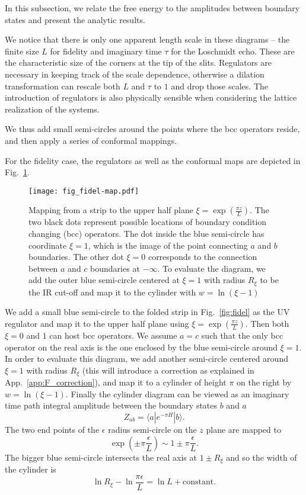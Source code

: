 
In this subsection, we relate the free energy to the amplitudes between boundary states and present the analytic results. 

We notice that there is only one apparent length scale in these diagrams -- the finite size $L$ for fidelity and imaginary time $\tau$ for the Loschmidt echo. These are the characteristic size of the corners at the tip of the slits. Regulators are necessary in keeping track of the scale dependence, otherwise a dilation transformation can rescale both $L$ and $\tau$ to $1$ and drop those scales. The introduction of regulators is also physically sensible when considering the lattice realization of the systems. 

We thus add small semi-circles around the points where the bcc operators reside, and then apply a series of conformal mappings. 

For the fidelity case, the regulators as well as the conformal maps are depicted in Fig.~\ref{fig:fidel-map}. 
\begin{figure}[h]
\centering
\texttt{[image: fig\_fidel-map.pdf]}
\caption{Mapping from a strip to the upper half plane $\xi  = \exp( \frac{\pi z}{L} ) $. The two black dots represent possible locations of boundary condition changing (bcc) operators. The dot inside the blue semi-circle has coordinate $\xi = 1$, which is the image of the point connecting $a$ and $b$ boundaries. The other dot $\xi = 0$ corresponds to the connection between $a$ and $c$ boundaries at $- \infty$. To evaluate the diagram, we add the outer blue semi-circle centered at $\xi = 1$ with radius $R_{\xi}$ to be the IR cut-off and map it to the cylinder with $w = \ln(\xi - 1)$}
\label{fig:fidel-map}
\end{figure}
We add a small blue semi-circle to the folded strip in Fig.~\ref{fig:fidel} as the UV regulator and map it to the upper half plane using $\xi  = \exp( \frac{\pi z}{L} )$. Then both $\xi = 0$ and $1$ can host bcc operators. We assume $a = c$ such that the only bcc operator on the real axis is the one enclosed by the blue semi-circle around $\xi = 1$. In order to evaluate this diagram, we add another semi-circle centered around $\xi = 1$ with radius $R_{\xi}$ (this will introduce a correction as explained in App.~\ref{app:F_correction}), and map it to a cylinder of height $\pi$ on the right by $w = \ln ( \xi- 1)$. Finally the cylinder diagram can be viewed as an imaginary time path integral amplitude between the boundary states $b$ and $a$
\begin{equation}
\label{eq:partition_fun}
Z_{ab} = \langle a | e^{-\pi H } |b \rangle.
\end{equation}
The two end points of the $\epsilon$ radius semi-circle on the $z$ plane are mapped to
\begin{equation}
\exp( \pm \pi \frac{\epsilon}{ L}  ) \sim 1 \pm \pi \frac{\epsilon}{L} .
\end{equation}
The bigger blue semi-circle intersects the real axis at $1 \pm R_{\xi}$ and so the width of the cylinder is 
\begin{equation}
\label{eq:fidel_cyd_width}
\ln R_{\xi} - \ln \frac{\pi \epsilon}{L} = \ln L + \text{constant}.
\end{equation}

